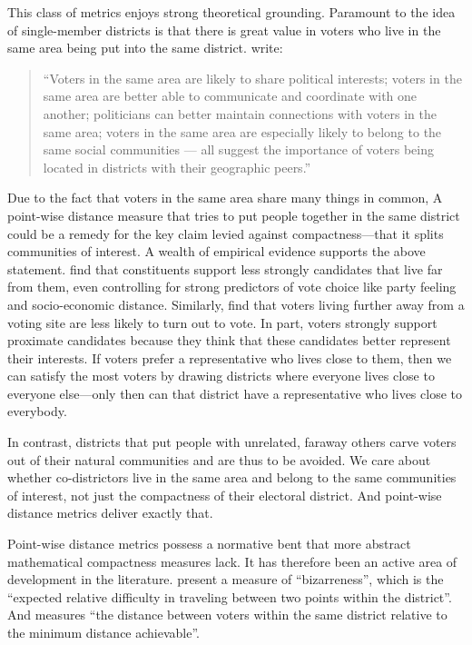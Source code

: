 \documentclass[]{article}
\begin{document}
This class of metrics enjoys strong theoretical grounding. Paramount to
the idea of single-member districts is that there is great value in
voters who live in the same area being put into the same district.
\cite{er2019} write:

\begin{quote}
``Voters in the same area are likely to share political interests;
voters in the same area are better able to communicate and coordinate
with one another; politicians can better maintain connections with
voters in the same area; voters in the same area are especially likely
to belong to the same social communities --- all suggest the importance
of voters being located in districts with their geographic peers.''
\end{quote}

Due to the fact that voters in the same area share many things in
common, A point-wise distance measure that tries to put people together
in the same district could be a remedy for the key claim levied against
compactness---that it splits communities of interest. A wealth of
empirical evidence supports the above statement. \cite{arzheimer2012}
find that constituents support less strongly candidates that live far
from them, even controlling for strong predictors of vote choice like
party feeling and socio-economic distance. Similarly, \cite{dyck2005}
find that voters living further away from a voting site are less likely
to turn out to vote. In part, voters strongly support proximate
candidates because they think that these candidates better represent
their interests. If voters prefer a representative who lives close to
them, then we can satisfy the most voters by drawing districts where
everyone lives close to everyone else---only then can that district have
a representative who lives close to everybody.

In contrast, districts that put people with unrelated, faraway others
carve voters out of their natural communities and are thus to be
avoided. We care about whether co-districtors live in the same area and
belong to the same communities of interest, not just the compactness of
their electoral district. And point-wise distance metrics deliver
exactly that.

Point-wise distance metrics possess a normative bent that more abstract
mathematical compactness measures lack. It has therefore been an active
area of development in the literature. \cite{cm2010} present a measure
of ``bizarreness'', which is the ``expected relative difficulty in
traveling between two points within the district''. And \cite{fh2011}
measures ``the distance between voters within the same district relative
to the minimum distance achievable''.
\end{document}

